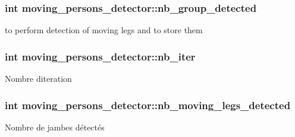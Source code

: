 \subsubsection[{\texorpdfstring{nb\+\_\+group\+\_\+detected}{nb_group_detected}}]{\setlength{\rightskip}{0pt plus 5cm}int moving\+\_\+persons\+\_\+detector\+::nb\+\_\+group\+\_\+detected\hspace{0.3cm}{\ttfamily [private]}}\hypertarget{classmoving__persons__detector_a7f33b7e0a227a032dc845a74cc805837}{}\label{classmoving__persons__detector_a7f33b7e0a227a032dc845a74cc805837}
to perform detection of moving legs and to store them 
\subsubsection[{\texorpdfstring{nb\+\_\+iter}{nb_iter}}]{\setlength{\rightskip}{0pt plus 5cm}int moving\+\_\+persons\+\_\+detector\+::nb\+\_\+iter\hspace{0.3cm}{\ttfamily [private]}}\hypertarget{classmoving__persons__detector_a798768403d1a8a3964ca22723fbd3918}{}\label{classmoving__persons__detector_a798768403d1a8a3964ca22723fbd3918}
Nombre d\textquotesingle{}iteration 
\subsubsection[{\texorpdfstring{nb\+\_\+moving\+\_\+legs\+\_\+detected}{nb_moving_legs_detected}}]{\setlength{\rightskip}{0pt plus 5cm}int moving\+\_\+persons\+\_\+detector\+::nb\+\_\+moving\+\_\+legs\+\_\+detected\hspace{0.3cm}{\ttfamily [private]}}\hypertarget{classmoving__persons__detector_aee7e42a55781f7c7297c7355296c6666}{}\label{classmoving__persons__detector_aee7e42a55781f7c7297c7355296c6666}
Nombre de jambes détectés 

